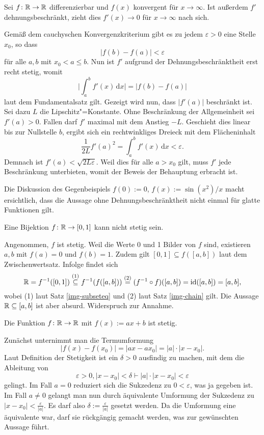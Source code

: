 \begin{Satz}
Sei $f\colon\mathbb R\to\mathbb R$ differenzierbar und $f(x)$ konvergent
für $x\to\infty$. Ist außerdem $f'$  dehnungsbeschränkt,
zieht dies $f'(x)\to 0$ für $x\to\infty$ nach sich.
\end{Satz}
\begin{Beweis}
Gemäß dem cauchyschen Konvergenzkriterium gibt es zu jedem
$\varepsilon>0$ eine Stelle $x_0$, so dass%
\[|f(b)-f(a)| < \varepsilon\]
für alle $a,b$ mit $x_0 < a \le b$. Nun ist $f'$ aufgrund
der Dehnungsbeschränktheit erst recht stetig, womit%
\[\bigg|\int_a^b f'(x)\,\mathrm dx\bigg| = |f(b)-f(a)|\]
laut dem Fundamentalsatz gilt. Gezeigt wird nun, dass $|f'(a)|$
beschränkt ist. Sei dazu $L$ die Lipschitz"=Konstante. Ohne
Beschränkung der Allgemeinheit sei $f'(a)>0$. Fallen darf $f'$ maximal
mit dem Anstieg $-L$. Geschieht dies linear bis zur Nullstelle $b$,
ergibt sich ein rechtwinkliges Dreieck mit dem Flächeninhalt%
\[\frac{1}{2L} f'(a)^2 = \int_a^b f'(x)\,\mathrm dx < \varepsilon.\]
Demnach ist $f'(a) < \sqrt{2L\varepsilon}$. Weil dies für alle $a>x_0$
gilt, muss $f'$ jede Beschränkung unterbieten, womit
der Beweis der Behauptung erbracht ist.\;\qedsymbol
\end{Beweis}

\noindent
Die Diskussion des Gegenbeispiels $f(0):=0$, $f(x):=\sin(x^2)/x$ macht
ersichtlich, dass die Aussage ohne Dehnungsbeschränktheit nicht einmal
für glatte Funktionen gilt.

\newpage
\begin{Satz}
Eine Bijektion $f\colon\mathbb R\to [0,1]$ kann nicht stetig sein.
\end{Satz}
\begin{Beweis}
Angenommen, $f$ ist stetig. Weil die Werte 0 und 1 Bilder von $f$
sind, existieren $a,b$ mit $f(a)=0$ und $f(b)=1$. Zudem gilt
$[0,1]\subseteq f([a,b])$ laut dem Zwischenwertsatz. Infolge findet sich
\[\mathbb R = f^{-1}([0,1]) \stackrel{\text{(1)}}\subseteq f^{-1}(f([a,b]))
\stackrel{\text{(2)}}= (f^{-1}\circ f)([a,b]) = \operatorname{id}([a,b]) = [a,b],\]
wobei (1) laut Satz \ref{img-subseteq} und (2) laut Satz
\ref{img-chain} gilt. Die Aussage $\mathbb R\subseteq [a,b]$ ist aber
absurd. Widerspruch zur Annahme.\,\qedsymbol
\end{Beweis}

\begin{Satz}
Die Funktion $f\colon\mathbb R\to\mathbb R$ mit $f(x):=ax+b$ ist stetig.
\end{Satz}
\begin{Beweis}
Zunächst unternimmt man die Termumformung
\[|f(x)-f(x_0)| = |ax-ax_0| = |a|\cdot |x-x_0|.\]
Laut Definition der Stetigkeit ist ein $\delta>0$ ausfindig zu machen,
mit dem die Ableitung von
\[\varepsilon>0, |x-x_0|<\delta\vdash |a|\cdot |x-x_0|<\varepsilon\]
gelingt. Im Fall $a=0$ reduziert sich die Sukzedenz zu
$0<\varepsilon$, was ja gegeben ist. Im Fall $a\ne 0$ gelangt man nun
durch äquivalente Umformung der Sukzedenz zu
$|x-x_0| < \frac{\varepsilon}{|a|}$.
Es darf also $\delta:=\frac{\varepsilon}{|a|}$ gesetzt werden.
Da die Umformung eine äquivalente war, darf sie rückgängig gemacht
werden, was zur gewünschten Aussage führt.\,\qedsymbol
\end{Beweis}


